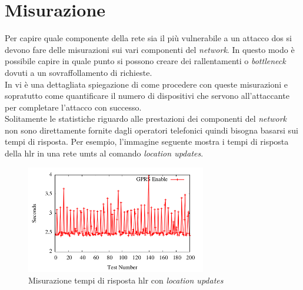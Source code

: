 \section{Misurazione}
Per capire quale componente della rete sia il più vulnerabile a un attacco \gls{dos} si devono fare delle misurazioni sui vari componenti del \textit{network}.
In questo modo è possibile capire in quale punto si possono creare dei rallentamenti o \textit{bottleneck} dovuti a un sovraffollamento di richieste.\\
In \cite{measuring-dos} vi è una dettagliata spiegazione di come procedere con queste misurazioni e sopratutto come quantificare il numero di dispositivi che 
servono all'attaccante per completare l'attacco con successo.\\
Solitamente le statistiche riguardo alle prestazioni dei componenti del \textit{network} non sono direttamente fornite dagli operatori telefonici quindi bisogna 
basarsi sui tempi di risposta. Per esempio, l'immagine seguente mostra i tempi di risposta della \gls{hlr} in una rete \gls{umts} al comando \textit{location updates}.
\begin{figure}[h]
    \centering
    \includegraphics[width=0.7\textwidth]{images/hlr-measuring.png}
    \caption{Misurazione tempi di risposta \gls{hlr} con \textit{location updates}\cite{measuring-dos}}
\end{figure}